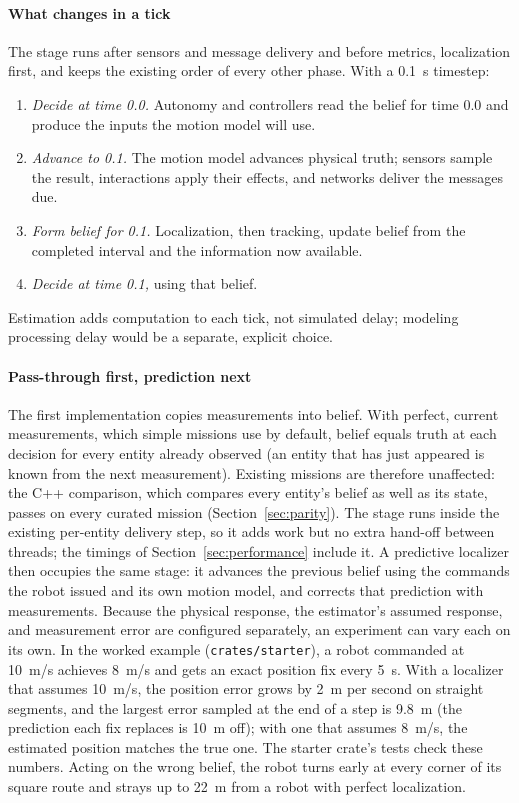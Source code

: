 \documentclass[conference]{IEEEtran}
\begin{document}
\paragraph{What changes in a tick}
The stage runs after sensors and message delivery and before metrics,
localization first, and keeps the existing order of every other phase. With a
0.1~s timestep:
\begin{enumerate}
\item \emph{Decide at time 0.0.} Autonomy and controllers read the belief for
time 0.0 and produce the inputs the motion model will use.
\item \emph{Advance to 0.1.} The motion model advances physical truth; sensors
sample the result, interactions apply their effects, and networks deliver the
messages due.
\item \emph{Form belief for 0.1.} Localization, then tracking, update belief
from the completed interval and the information now available.
\item \emph{Decide at time 0.1,} using that belief.
\end{enumerate}
Estimation adds computation to each tick, not simulated delay; modeling
processing delay would be a separate, explicit choice.

\paragraph{Pass-through first, prediction next}
The first implementation copies measurements into belief. With perfect, current
measurements, which simple missions use by default, belief equals truth at
each decision for every entity already observed (an entity that has just
appeared is known from the next measurement). Existing missions are therefore
unaffected: the C++ comparison, which compares every entity's belief as well as
its state, passes on every curated mission (Section~\ref{sec:parity}). The
stage runs inside the existing per-entity delivery step, so it adds work but no
extra hand-off between threads; the timings of Section~\ref{sec:performance}
include it. A predictive
localizer then occupies the same stage: it advances the previous belief using
the commands the robot issued and its own motion model, and corrects that
prediction with measurements. Because the physical response, the estimator's
assumed response, and measurement error are configured separately, an
experiment can vary each on its own. In the worked example
(\texttt{crates/starter}), a robot commanded at 10~m/s achieves 8~m/s and gets
an exact position fix every 5~s. With a localizer that assumes 10~m/s, the
position error grows by 2~m per second on straight segments, and the largest
error sampled at the end of a step is 9.8~m (the prediction each fix replaces
is 10~m off); with one that assumes 8~m/s, the estimated
position matches the true one. The starter crate's tests check these numbers.
Acting on the wrong belief, the robot turns early at every corner
of its square route and strays up to 22~m from a robot with perfect
localization.
\end{document}
